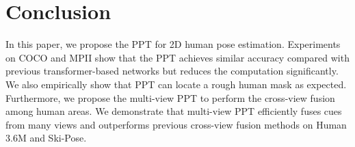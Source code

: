 \documentclass[runningheads]{llncs}
\begin{document}
\section{Conclusion}
\vspace{-0.5em}
In this paper, we propose the PPT for 2D human pose estimation. Experiments on COCO and MPII show that the PPT achieves similar accuracy compared with previous transformer-based networks but reduces the computation significantly. We also empirically show that PPT can locate a rough human mask as expected. 
Furthermore, we propose the multi-view PPT to perform the cross-view fusion among human areas. We demonstrate that multi-view PPT efficiently fuses cues from many views and outperforms previous cross-view fusion methods on Human 3.6M and Ski-Pose. 
\end{document}
